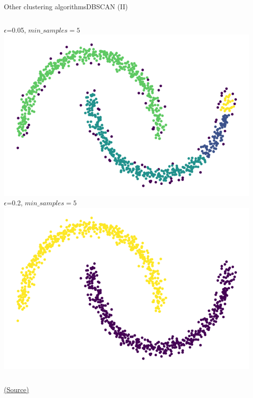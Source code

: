 \documentclass[10pt,compress]{beamer} %
\begin{document}
\begin{frame}{Other clustering algorithms}{DBSCAN (II)}
    \begin{columns}
        \centering $\epsilon$=0.05, $min\_samples=5$\\
	    \includegraphics[width=\textwidth]{figs/dbscan1.png}\\
        
       \centering $\epsilon$=0.2, $min\_samples=5$\\
	   \includegraphics[width=\textwidth]{figs/dbscan2.png}\\
    \end{columns}
    \centering \scriptsize{\href{https://github.com/Akramz/Hands-on-Machine-Learning-with-Scikit-Learn-Keras-and-TensorFlow/blob/master/09.Unsupervised_learning.ipynb}{(Source)}}
\end{frame}
\end{document}
